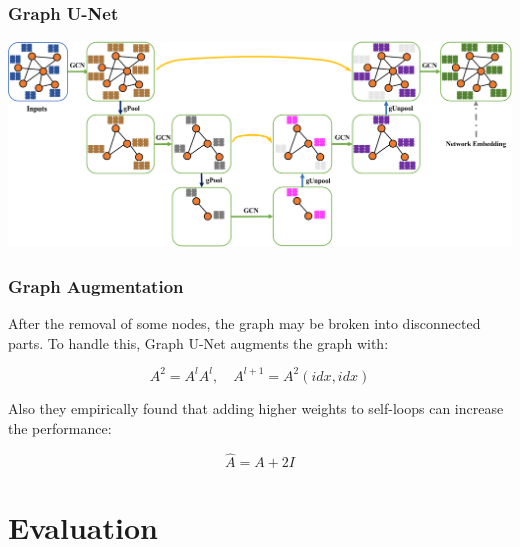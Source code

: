 \documentclass[12pt,aspectratio=169]{beamer}
\begin{document}
    \begin{frame}
        \frametitle{Graph U-Net}

        \centering
        \includegraphics[scale=0.215]{GUnet.png}
    \end{frame}

    \begin{frame}
        \frametitle{Graph Augmentation}

        After the removal of some nodes, the graph may be broken into disconnected parts. To handle this, Graph U-Net
        augments the graph with:

        $$ A^2 = A^lA^l, \quad A^{l+1} = A^2(idx, idx) $$

        Also they empirically found that adding higher weights to self-loops can increase the performance:

        $$ \hat{A} = A + 2I $$
    \end{frame}

    \section{Evaluation}
\end{document}

